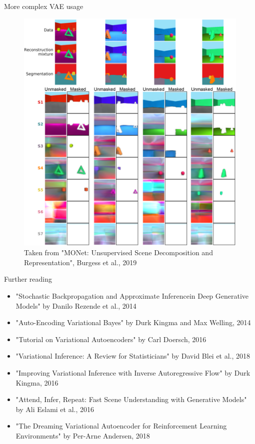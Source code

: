 \documentclass[10pt]{beamer}
\begin{document}
\begin{frame}{More complex VAE usage}
    \begin{figure}
        \includegraphics[height=0.7\textheight]{figs/monet_oir_decomposition_masked.png}
        \caption{Taken from "MONet: Unsupervised Scene Decomposition and Representation", Burgess et al., 2019}
    \end{figure}
\end{frame}

\begin{frame}{Further reading}
    \begin{itemize}
        \item "Stochastic Backpropagation and Approximate Inferencein Deep Generative Models" by Danilo Rezende et al., 2014
        \item "Auto-Encoding Variational Bayes" by Durk Kingma and Max Welling, 2014
        \item "Tutorial on Variational Autoencoders" by Carl Doersch, 2016
        \item "Variational Inference: A Review for Statisticians" by David Blei et al., 2018
        \item "Improving Variational Inference with Inverse Autoregressive Flow" by Durk Kingma, 2016
        \item "Attend, Infer, Repeat: Fast Scene Understanding with Generative Models" by Ali Eslami et al., 2016
        \item "The Dreaming Variational Autoencoder for Reinforcement Learning Environments" by Per-Arne Andersen, 2018
    \end{itemize}
\end{frame}
\end{document}
